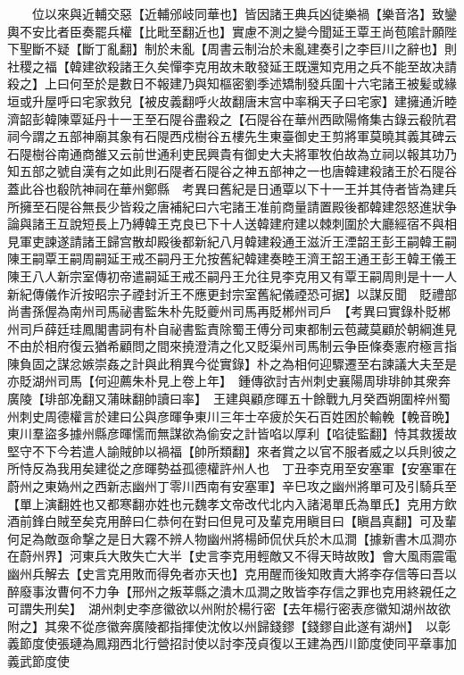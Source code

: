 　　位以來與近輔交惡【近輔邠岐同華也】皆因諸王典兵凶徒樂禍【樂音洛】致鑾輿不安比者臣奏罷兵權【比毗至翻近也】實慮不測之變今聞延王覃王尚苞隂計願陛下聖斷不疑【斷丁亂翻】制於未亂【周書云制治於未亂建奏引之李巨川之辭也】則社稷之福【韓建欲殺諸王久矣憚李克用故未敢發延王既還知克用之兵不能至故决請殺之】上曰何至於是數日不報建乃與知樞密劉季述矯制發兵圍十六宅諸王被髪或緣垣或升屋呼曰宅家救兒【被皮義翻呼火故翻唐末宫中率稱天子曰宅家】建擁通沂睦濟韶彭韓陳覃延丹十一王至石隄谷盡殺之【石隄谷在華州西歐陽脩集古錄云殽阬君祠今謂之五部神廟其象有石隄西戍樹谷五樓先生東臺御史王剪將軍莫曉其義其碑云石隄樹谷南通商雒又云前世通利吏民興貴有御史大夫將軍牧伯故為立祠以報其功乃知五部之號自漢有之如此則石隄者石隄谷之神五部神之一也唐韓建殺諸王於石隄谷蓋此谷也殽阬神祠在華州鄭縣　考異曰舊紀是日通覃以下十一王并其侍者皆為建兵所擁至石隄谷無長少皆殺之唐補紀曰六宅諸王准前商量請置殿後都韓建怨怒進狀争論與諸王互說短長上乃縛韓王克良已下十人送韓建府建以棘刺圍於大廳經宿不與相見軍吏諫遂請諸王歸宫散却殿後都新紀八月韓建殺通王滋沂王湮韶王彭王嗣韓王嗣陳王嗣覃王嗣周嗣延王戒丕嗣丹王允按舊紀韓建奏睦王濟王韶王通王彭王韓王儀王陳王八人新宗室傳初帝遣嗣延王戒丕嗣丹王允往見李克用又有覃王嗣周則是十一人新紀傳儀作沂按昭宗子禋封沂王不應更封宗室舊紀儀禋恐可据】以謀反聞　貶禮部尚書孫偓為南州司馬祕書監朱朴先貶夔州司馬再貶郴州司戶　【考異曰實錄朴貶郴州司戶薛廷珪鳳閣書詞有朴自祕書監責除蜀王傅分司東都制云苞藏莫顧於朝綱進見不由於相府復云猶希顧問之間來撓澄清之化又貶渠州司馬制云争臣條奏憲府極言指陳負固之謀忿嫉崇姦之計與此稍異今從實錄】朴之為相何迎驟遷至右諫議大夫至是亦貶湖州司馬【何迎薦朱朴見上卷上年】　鍾傳欲討吉州刺史襄陽周琲琲帥其衆奔廣陵【琲部凂翻又蒲昧翻帥讀曰率】　王建與顧彦暉五十餘戰九月癸酉朔圍梓州蜀州刺史周德權言於建曰公與彦暉争東川三年士卒疲於矢石百姓困於輸輓【輓音晩】東川羣盜多據州縣彦暉懦而無謀欲為偷安之計皆啗以厚利【啗徒監翻】恃其救援故堅守不下今若遣人諭賊帥以禍福【帥所類翻】來者賞之以官不服者威之以兵則彼之所恃反為我用矣建從之彦暉勢益孤德權許州人也　丁丑李克用至安塞軍【安塞軍在蔚州之東媯州之西新志幽州丁零川西南有安塞軍】辛巳攻之幽州將單可及引騎兵至【單上演翻姓也又都寒翻亦姓也元魏孝文帝改代北内入諸渇單氏為單氏】克用方飲酒前鋒白賊至矣克用醉曰仁恭何在對曰但見可及輩克用瞋目曰【瞋昌真翻】可及輩何足為敵亟命撃之是日大霧不辨人物幽州將楊師侃伏兵於木瓜澗【據新書木瓜澗亦在蔚州界】河東兵大敗失亡大半【史言李克用輕敵又不得天時故敗】會大風雨震電幽州兵解去【史言克用敗而得免者亦天也】克用醒而後知敗責大將李存信等曰吾以醉廢事汝曹何不力争【邢州之叛莘縣之潰木瓜澗之敗皆李存信之罪也克用終親任之可謂失刑矣】　湖州刺史李彦徽欲以州附於楊行密【去年楊行密表彦徽知湖州故欲附之】其衆不從彦徽奔廣陵都指揮使沈攸以州歸錢鏐【錢鏐自此遂有湖州】　以彰義節度使張璉為鳳翔西北行營招討使以討李茂貞復以王建為西川節度使同平章事加義武節度使

